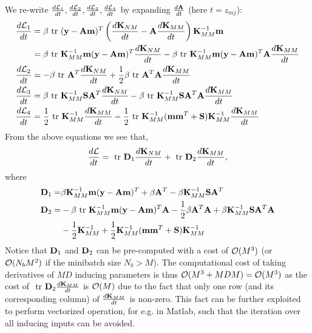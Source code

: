 \documentclass{article} %
\begin{document}
\noindent We re-write $\frac{d \mathcal{L}_1}{dt}, \frac{d \mathcal{L}_2}{dt}, \frac{d \mathcal{L}_3}{dt}, \frac{d \mathcal{L}_4}{dt}$ by expanding $\frac{d\mathbf{A}}{dt}$ (here $t = z_{mj}$):
\begin{align}
\nonumber
\frac{d \mathcal{L}_1}{dt}
 &= \beta \mbox{ \rm tr } (\mathbf{y} - \mathbf{A}\mathbf{m})^T \left(\frac{d\mathbf{K}_{NM}}{dt} -  \mathbf{A} \frac{d \mathbf{K}_{MM}}{dt}\right)\mathbf{K}_{MM}^{-1} \mathbf{m} \\
&= \beta \mbox{ \rm tr } \mathbf{K}_{MM}^{-1} \mathbf{m} (\mathbf{y} - \mathbf{A}\mathbf{m})^T \frac{d\mathbf{K}_{NM}}{dt} 
-\beta \mbox{ \rm tr } \mathbf{K}_{MM}^{-1} \mathbf{m} (\mathbf{y} - \mathbf{A}\mathbf{m})^T \mathbf{A} \frac{d \mathbf{K}_{MM}}{dt} \\
\frac{d \mathcal{L}_2}{dt}
&= - \beta \mbox{ \rm tr } \mathbf{A}^T \frac{d \mathbf{K}_{NM}}{dt}
 + \frac{1}{2} \beta \mbox{ \rm tr } \mathbf{A}^T \mathbf{A} \frac{d \mathbf{K}_{MM}}{dt}  \\
\frac{d \mathcal{L}_3}{dt}
&= \beta \mbox{ \rm tr } \mathbf{K}_{MM}^{-1} \mathbf{S} \mathbf{A}^T \frac{d \mathbf{K}_{NM}}{dt}
 - \beta \mbox{ \rm tr } \mathbf{K}_{MM}^{-1} \mathbf{S} \mathbf{A}^T \mathbf{A} \frac{d\mathbf{K}_{MM}}{dt}\\
\frac{d \mathcal{L}_4}{dt}
 &= \frac{1}{2}  \mbox{ \rm tr } \mathbf{K}_{MM}^{-1} \frac{d \mathbf{K}_{MM}}{dt}
  - \frac{1}{2} \mbox{ \rm tr } \mathbf{K}_{MM}^{-1} (\mathbf{m} \mathbf{m}^T + \mathbf{S}) \mathbf{K}_{MM}^{-1} \frac{d \mathbf{K}_{MM}}{dt} 
\end{align}
From the above equations we see that,
\begin{align}
\frac{d\mathcal{L}}{dt} = \mbox{ \rm tr } \mathbf{D}_1 \frac{d\mathbf{K}_{NM}}{dt} + \mbox{ \rm tr } \mathbf{D}_2 \frac{d \mathbf{K}_{MM}}{dt},
\end{align}
where 
\begin{align}
\mathbf{D}_1 =& \beta \mathbf{K}_{MM}^{-1} \mathbf{m} (\mathbf{y} - \mathbf{A}\mathbf{m})^T
 + \beta \mathbf{A}^T
 - \beta \mathbf{K}_{MM}^{-1} \mathbf{S} \mathbf{A}^T \\ \nonumber
\mathbf{D}_2 =& -\beta \mbox{ \rm tr } \mathbf{K}_{MM}^{-1} \mathbf{m} (\mathbf{y} - \mathbf{A}\mathbf{m})^T \mathbf{A}
 - \frac{1}{2} \beta \mathbf{A}^T \mathbf{A}
  + \beta \mathbf{K}_{MM}^{-1} \mathbf{S} \mathbf{A}^T \mathbf{A}	 \\ 
  &-\frac{1}{2} \mathbf{K}_{MM}^{-1} + \frac{1}{2} \mathbf{K}_{MM}^{-1} (\mathbf{m} \mathbf{m}^T + \mathbf{S}) \mathbf{K}_{MM}^{-1}
\end{align}
Notice that $\mathbf{D}_1$ and $\mathbf{D}_2$ can be pre-computed with a cost of $\mathcal{O}(M^3)$ (or $\mathcal{O}(N_bM^2)$ if the minibatch size $N_b > M$).
The computational cost of taking derivatives of $MD$ inducing parameters is thus $\mathcal{O}(M^3 + MDM) = \mathcal{O}(M^3)$ as the cost of $\mbox{ \rm tr } \mathbf{D}_2 \frac{d \mathbf{K}_{MM}}{dt}$ is $\mathcal{O}(M)$ due to the fact that only one row (and its corresponding column) of $\frac{d \mathbf{K}_{MM}}{dt}$ is non-zero.
This fact can be further exploited to perform vectorized operation, for e.g. in Matlab, such that the iteration over all inducing inputs can be avoided.
\end{document}
